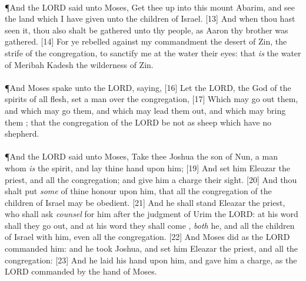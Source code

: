 \\
\P \textcolor[cmyk]{0.99998,1,0,0}{And the LORD said unto Moses, Get thee up into this mount Abarim, and see the land which I have given unto the children of Israel.}
[13] \textcolor[cmyk]{0.99998,1,0,0}{And when thou hast seen it, thou also shalt be gathered unto thy people, as Aaron thy brother was gathered.}
[14] \textcolor[cmyk]{0.99998,1,0,0}{For ye rebelled against my commandment  the desert of Zin,  the strife of the congregation, to sanctify me at the water  their eyes: that \emph{is} the water of Meribah  Kadesh  the wilderness of Zin.}\\
\\
\P \textcolor[cmyk]{0.99998,1,0,0}{And Moses spake unto the LORD, saying,}
[16] \textcolor[cmyk]{0.99998,1,0,0}{Let the LORD, the God of the spirits of all flesh, set a man over the congregation,}
[17] \textcolor[cmyk]{0.99998,1,0,0}{Which may go out  them, and which may go   them, and which may lead them out, and which may bring them ; that the congregation of the LORD be not as sheep which have no shepherd.}\\
\\
\P \textcolor[cmyk]{0.99998,1,0,0}{And the LORD said unto Moses, Take thee Joshua the son of Nun, a man  whom \emph{is} the spirit, and lay thine hand upon him;}
[19] \textcolor[cmyk]{0.99998,1,0,0}{And set him  Eleazar the priest, and  all the congregation; and give him a charge  their sight.}
[20] \textcolor[cmyk]{0.99998,1,0,0}{And thou shalt put \emph{some} of thine honour upon him, that all the congregation of the children of Israel may be obedient.}
[21] \textcolor[cmyk]{0.99998,1,0,0}{And he shall stand  Eleazar the priest, who shall ask \emph{counsel} for him after the judgment of Urim  the LORD: at his word shall they go out, and at his word they shall come , \emph{both} he, and all the children of Israel with him, even all the congregation.}
[22] \textcolor[cmyk]{0.99998,1,0,0}{And Moses did as the LORD commanded him: and he took Joshua, and set him  Eleazar the priest, and  all the congregation:}
[23] \textcolor[cmyk]{0.99998,1,0,0}{And he laid his hand upon him, and gave him a charge, as the LORD commanded by the hand of Moses.}